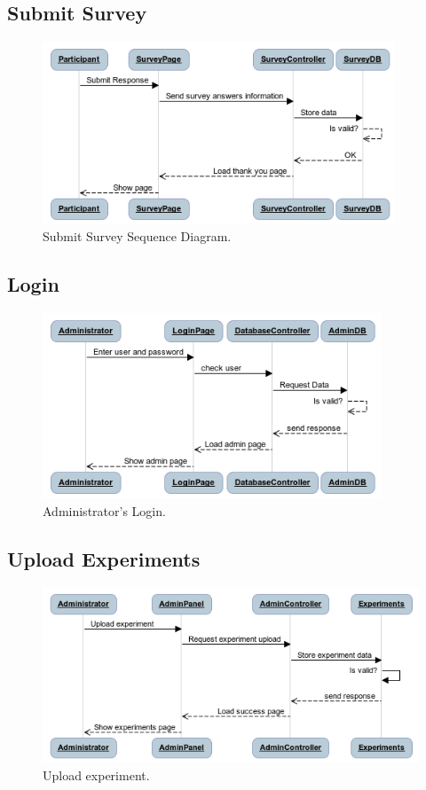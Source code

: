\documentclass[a4paper,12pt,oneside]{report}
\begin{document}
\subsection{Submit Survey}
\begin{figure}[!hp]
  \begin{center}
   \includegraphics[width=10.5cm]{pics/submit.png}
  \end{center}
\caption{Submit Survey Sequence Diagram.}
\end{figure}
\vskip 2cm
\subsection{Login}
\begin{figure}[!hp]
  \begin{center}
   \includegraphics[width=10.1cm]{pics/loginse.png}
  \end{center}
\caption{Administrator's Login.}
\end{figure}
\newpage
\subsection{Upload Experiments}
\begin{figure}[!hp]
  \begin{center}
   \includegraphics[width=11.3cm]{pics/upload.png}
  \end{center}
\caption{Upload experiment.}
\end{figure}
\end{document}
